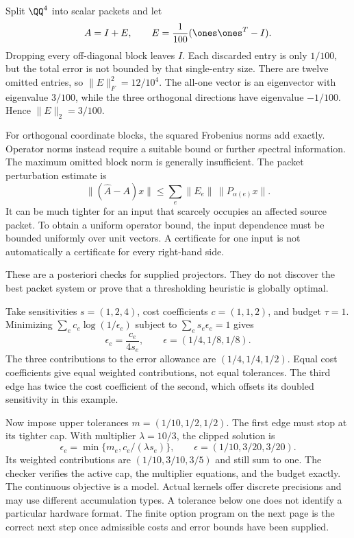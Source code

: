 Split $\QQ^4$ into scalar packets and let
\[
A=I+E,\qquad E=\frac1{100}(\ones\ones^T-I).
\]
Dropping every off-diagonal block leaves $I$. Each discarded entry is only $1/100$, but the total error is not bounded by that single-entry size.
There are twelve omitted entries, so $\|E\|_F^2=12/10^4$. The all-one vector is an eigenvector with eigenvalue $3/100$, while the three orthogonal directions have eigenvalue $-1/100$. Hence $\|E\|_2=3/100$.

For orthogonal coordinate blocks, the squared Frobenius norms add exactly. Operator norms instead require a suitable bound or further spectral information. The maximum omitted block norm is generally insufficient.
The packet perturbation estimate is
\[
\|(\widehat A-A)x\|\le\sum_e\|E_e\|\,\|P_{\alpha(e)}x\|.
\]
It can be much tighter for an input that scarcely occupies an affected source packet. To obtain a uniform operator bound, the input dependence must be bounded uniformly over unit vectors. A certificate for one input is not automatically a certificate for every right-hand side.

These are a posteriori checks for supplied projectors. They do not discover the best packet system or prove that a thresholding heuristic is globally optimal.

Take sensitivities $s=(1,2,4)$, cost coefficients $c=(1,1,2)$, and budget $\tau=1$. Minimizing $\sum_ec_e\log(1/\epsilon_e)$ subject to $\sum_es_e\epsilon_e=1$ gives
\[
\epsilon_e=\frac{c_e}{4s_e},\qquad
\epsilon=(1/4,1/8,1/8).
\]
The three contributions to the error allowance are $(1/4,1/4,1/2)$. Equal cost coefficients give equal weighted contributions, not equal tolerances. The third edge has twice the cost coefficient of the second, which offsets its doubled sensitivity in this example.

Now impose upper tolerances $m=(1/10,1/2,1/2)$. The first edge must stop at its tighter cap. With multiplier $\lambda=10/3$, the clipped solution is
\[
\epsilon_e=\min\{m_e,c_e/(\lambda s_e)\},\qquad
\epsilon=(1/10,3/20,3/20).
\]
Its weighted contributions are $(1/10,3/10,3/5)$ and still sum to one. The checker verifies the active cap, the multiplier equations, and the budget exactly.
The continuous objective is a model. Actual kernels offer discrete precisions and may use different accumulation types. A tolerance below one does not identify a particular hardware format. The finite option program on the next page is the correct next step once admissible costs and error bounds have been supplied.

